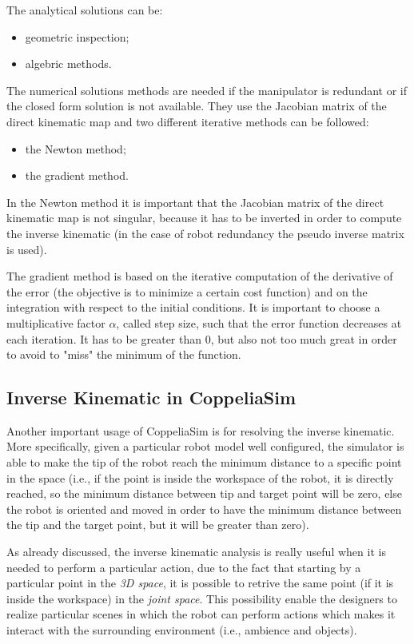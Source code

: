 The analytical solutions can be:
\begin{itemize}
    \item geometric inspection;
    \item algebric methods.
\end{itemize}

The numerical solutions methods are needed if the manipulator is redundant or if the closed form solution is not available. They use the Jacobian matrix of the direct kinematic map and two different iterative methods can be followed:
\begin{itemize}
    \item the Newton method;
    \item the gradient method.
\end{itemize}

In the Newton method it is important that the Jacobian matrix of the direct kinematic map is not singular, because it has to be inverted in order to compute the inverse kinematic (in the case of robot redundancy the pseudo inverse matrix is used).

The gradient method is based on the iterative computation of the derivative of the error (the objective is to minimize a certain cost function) and on the integration with respect to the initial conditions. It is important to choose a multiplicative factor $\alpha$, called step size, such that the error function decreases at each iteration. It has to be greater than 0, but also not too much great in order to avoid to "miss" the minimum of the function.

\subsection{Inverse Kinematic in CoppeliaSim}
Another important usage of CoppeliaSim is for resolving the inverse kinematic. More specifically, given a particular robot model well configured, the simulator is able to make the tip of the robot reach the minimum distance to a specific point in the space (i.e., if the point is inside the workspace of the robot, it is directly reached, so the minimum distance between tip and target point will be zero, else the robot is oriented and moved in order to have the minimum distance between the tip and the target point, but it will be greater than zero).

As already discussed, the inverse kinematic analysis is really useful when it is needed to perform a particular action, due to the fact that starting by a particular point in the \textit{3D space}, it is possible to retrive the same point (if it is inside the workspace) in the \textit{joint space}. This possibility enable the designers to realize particular scenes in which the robot can perform actions which makes it interact with the surrounding environment (i.e., ambience and objects).

